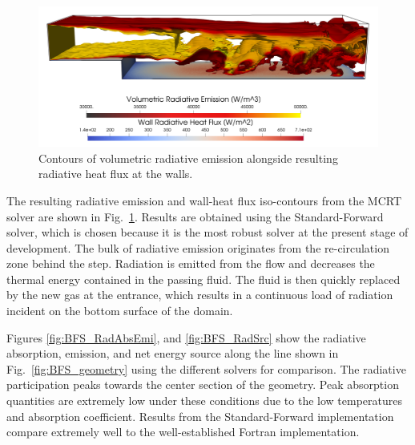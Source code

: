 \begin{figure}
\includegraphics[width=\linewidth]{figures/ch4/BFS_volwallflux3.png}
\caption{Contours of volumetric radiative emission alongside resulting radiative heat flux at the walls.}
\label{fig:BFS_radiationcontours}
\end{figure}
The resulting radiative emission and wall-heat flux iso-contours from the MCRT solver are shown in Fig.~\ref{fig:BFS_radiationcontours}. Results are obtained using the Standard-Forward solver, which is chosen because it is the most robust solver at the present stage of development.
The bulk of radiative emission originates from the re-circulation zone behind the step. Radiation is emitted from the flow and decreases the thermal energy contained in the passing fluid. 
The fluid is then quickly replaced by the new gas at the entrance, which results in a continuous load of radiation incident on the bottom surface of the domain. 

Figures \ref{fig:BFS_RadAbsEmi}, and \ref{fig:BFS_RadSrc} show the radiative absorption, emission, and net energy source along the line shown in Fig.~\ref{fig:BFS_geometry} using the different solvers for comparison. 
The radiative participation peaks towards the center section of the geometry. Peak absorption quantities are extremely low under these conditions due to the low temperatures and absorption coefficient. Results from the Standard-Forward implementation compare extremely well to the well-established Fortran implementation.


